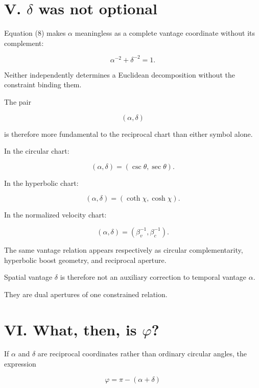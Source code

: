 \documentclass[9pt,twocolumn]{article}
\begin{document}
\section*{V. $\delta$ was not optional}

Equation (8) makes $\alpha$ meaningless as a complete vantage coordinate without its complement:

$$
\alpha^{-2}+\delta^{-2}=1.
$$

Neither independently determines a Euclidean decomposition without the constraint binding them.

The pair

$$
(\alpha,\delta)
$$

is therefore more fundamental to the reciprocal chart than either symbol alone.

In the circular chart:

\begin{equation}
(\alpha,\delta)
=
(\csc\theta,\sec\theta).
\tag{27}
\end{equation}

In the hyperbolic chart:

\begin{equation}
(\alpha,\delta)
=
(\coth\chi,\cosh\chi).
\tag{28}
\end{equation}

In the normalized velocity chart:

\begin{equation}
(\alpha,\delta)
=
(\beta_v^{-1},\beta_c^{-1}).
\tag{29}
\end{equation}

The same vantage relation appears respectively as circular complementarity, hyperbolic boost geometry, and reciprocal aperture.

Spatial vantage $\delta$ is therefore not an auxiliary correction to temporal vantage $\alpha$.

They are dual apertures of one constrained relation.

\section*{VI. What, then, is $\varphi$?}

If $\alpha$ and $\delta$ are reciprocal coordinates rather than ordinary circular angles, the expression

\begin{equation}
\varphi=\pi-(\alpha+\delta)
\tag{30}
\end{equation}
\end{document}
